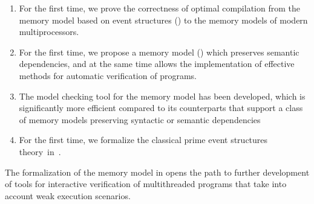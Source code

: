 {\novelty}
\begin{enumerate}[beginpenalty=10000] %

\item For the first time, we prove the correctness of optimal compilation from the memory model based on event structures (\Wkm) to the memory models of modern multiprocessors.
\item For the first time, we propose a memory model (\WkmS) which preserves semantic dependencies, and at the same time allows the implementation of effective methods for automatic verification of programs.
\item The \wmc model checking tool for the \WkmS memory model has been developed, which is significantly more efficient compared to its counterparts that support a class of memory models preserving syntactic or semantic dependencies
\item For the first time, we formalize the classical prime event structures theory~in~\coq.
\end{enumerate}

{\influence}
The formalization of the \Wkm memory model in \coq opens the path to further development of tools for interactive verification of multithreaded programs that take into account weak execution scenarios.

